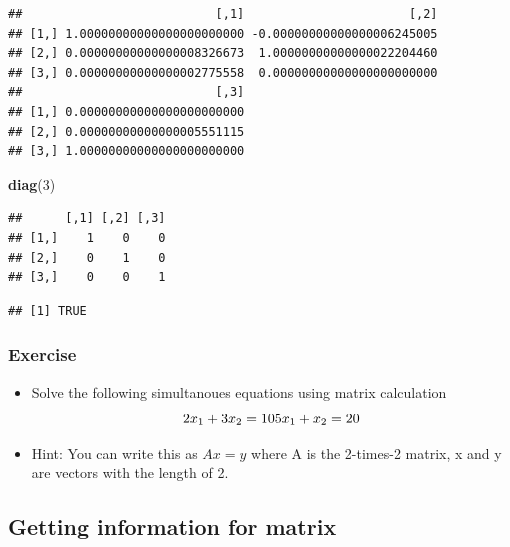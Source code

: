 \documentclass[]{book}
\newenvironment{Shaded}{\begin{snugshade}}{\end{snugshade}}
\newcommand{\KeywordTok}[1]{\textcolor[rgb]{0.13,0.29,0.53}{\textbf{#1}}}
\newcommand{\DecValTok}[1]{\textcolor[rgb]{0.00,0.00,0.81}{#1}}
\newcommand{\StringTok}[1]{\textcolor[rgb]{0.31,0.60,0.02}{#1}}
\newcommand{\OperatorTok}[1]{\textcolor[rgb]{0.81,0.36,0.00}{\textbf{#1}}}
\newcommand{\NormalTok}[1]{#1}
\providecommand{\tightlist}{%
  \setlength{\itemsep}{0pt}\setlength{\parskip}{0pt}}
\begin{document}
\begin{verbatim}
##                           [,1]                       [,2]
## [1,] 1.00000000000000000000000 -0.00000000000000006245005
## [2,] 0.00000000000000008326673  1.00000000000000022204460
## [3,] 0.00000000000000002775558  0.00000000000000000000000
##                           [,3]
## [1,] 0.00000000000000000000000
## [2,] 0.00000000000000005551115
## [3,] 1.00000000000000000000000
\end{verbatim}

\begin{Shaded}
\begin{Highlighting}[]
\KeywordTok{diag}\NormalTok{(}\DecValTok{3}\NormalTok{)}
\end{Highlighting}
\end{Shaded}

\begin{verbatim}
##      [,1] [,2] [,3]
## [1,]    1    0    0
## [2,]    0    1    0
## [3,]    0    0    1
\end{verbatim}

\begin{Shaded}
\end{Shaded}

\begin{verbatim}
## [1] TRUE
\end{verbatim}

\subsubsection{Exercise}\label{exercise}

\begin{itemize}
\tightlist
\item
  Solve the following simultanoues equations using matrix calculation \[
  2x_1+3x_2   =10 \\
  5x_1+x_2    =20
  \]
\item
  Hint: You can write this as \(Ax=y\) where A is the 2-times-2 matrix,
  x and y are vectors with the length of 2.
\end{itemize}

\subsection{Getting information for
matrix}\label{getting-information-for-matrix}
\end{document}
